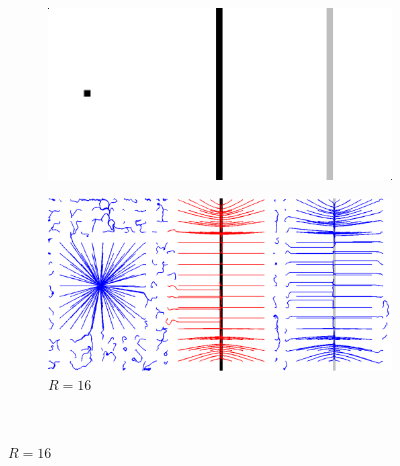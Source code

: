 \begin{appendices}
\begin{figure}[H]
   \begin{subfigure}[c]{.5\linewidth}
     \centering
     \includegraphics[width=\textwidth]{Chapters/Images/synthetic_map.png}
     \caption{}
   \end{subfigure} 
      \begin{subfigure}[c]{.5\linewidth}
     \centering
     \includegraphics[width=\textwidth]{Chapters/Images/m1_radius_16.png}
     \caption{$R=16$}
   \end{subfigure} \\
   

\end{figure}
\end{appendices}
